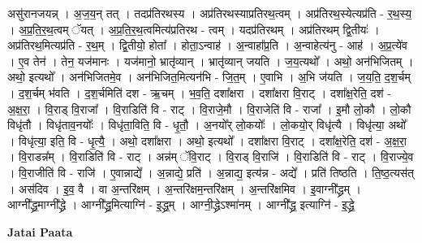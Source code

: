 \documentclass[17pt]{extarticle}
\begin{document}
असु॑रानजयन्न् । अ॒ज॒य॒न् तत् । तदप्र॑तिरथस्य । अप्र॑तिरथस्याप्रतिरथ॒त्वम् । अप्र॑तिरथ॒स्येत्यप्र॑ति - र॒थ॒स्य॒ । अ॒प्र॒ति॒र॒थ॒त्वम् ॅयत् । अ॒प्र॒ति॒र॒थ॒त्वमित्य॑प्रतिरथ - त्वम् । यदप्र॑तिरथम् । अप्र॑तिरथम् द्वि॒तीयः॑ । अप्र॑तिरथ॒मित्यप्र॑ति - र॒थ॒म् । द्वि॒तीयो॒ होता᳚ । होता॒ऽन्वाह॑ । अ॒न्वाहा᳚प्र॒ति । अ॒न्वाहेत्य॑नु - आह॑ । अ॒प्र॒त्ये॑व । ए॒व तेन॑ । तेन॒ यज॑मानः । यज॑मानो॒ भ्रातृ॑व्यान् । भ्रातृ॑व्यान् जयति । ज॒य॒त्यथो᳚ । अथो॒ अन॑भिजितम् । अथो॒ इत्यथो᳚ । अन॑भिजितमे॒व । अन॑भिजित॒मित्यन॑भि - जि॒त॒म् । ए॒वाभि । अ॒भि ज॑यति । ज॒य॒ति॒ द॒श॒र्चम् । द॒श॒र्चम् भ॑वति । द॒श॒र्चमिति॑ दश - ऋ॒चम् । भ॒व॒ति॒ दशा᳚क्षरा । दशा᳚क्षरा वि॒राट् । दशा᳚क्ष॒रेति॒ दश॑ - अ॒क्ष॒रा॒ । वि॒राड् वि॒राजा᳚ । वि॒राडिति॑ वि - राट् । वि॒राजे॒मौ । वि॒राजेति॑ वि - राजा᳚ । इ॒मौ लो॒कौ । लो॒कौ विधृ॑तौ । विधृ॑ताव॒नयोः᳚ । विधृ॑ता॒विति॒ वि - धृ॒तौ॒ । अ॒नयो᳚र् लो॒कयोः᳚ । लो॒कयो॒र् विधृ॑त्यै । विधृ॑त्या॒ अथो᳚ । विधृ॑त्या॒ इति॒ वि - धृ॒त्यै॒ । अथो॒ दशा᳚क्षरा । अथो॒ इत्यथो᳚ । दशा᳚क्षरा वि॒राट् । दशा᳚क्ष॒रेति॒ दश॑ - अ॒क्ष॒रा॒ । वि॒राडन्न᳚म् । वि॒राडिति॑ वि - राट् । अन्न॑म् ॅवि॒राट् । वि॒राड् वि॒राजि॑ । वि॒राडिति॑ वि - राट् । वि॒राज्ये॒व । वि॒राजीति॑ वि - राजि॑ । ए॒वान्नाद्ये᳚ । अ॒न्नाद्ये॒ प्रति॑ । अ॒न्नाद्य॒ इत्य॑न्न - अद्ये᳚ । प्रति॑ तिष्ठति । ति॒ष्ठ॒त्यस॑त् । अस॑दिव । इ॒व॒ वै । वा अ॒न्तरि॑क्षम् । अ॒न्तरि॑क्षम॒न्तरि॑क्षम् । अ॒न्तरि॑क्षमिव । इ॒वाग्नी᳚द्ध्रम् । आग्नी᳚द्ध्र॒माग्नी᳚द्ध्रे । आग्नी᳚द्ध्र॒मित्याग्नि॑ - इ॒द्ध्र॒म् । आग्नी॒द्ध्रेऽश्मा॑नम् । आग्नी᳚द्ध्र॒ इत्याग्नि॑ - इ॒द्ध्रे॒ \newline

\textbf{Jatai Paata} \newline
\end{document}
